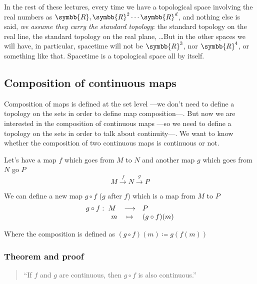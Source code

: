   In the rest of these lectures, every time we have a topological space
  involving the real numbers as $\symbb{R}, \symbb{R}^2 \cdots \symbb{R}^d$,
  and nothing else is said, \emph{we assume they carry the standard topology}:
  the standard topology on the real line, the standard topology on the real
  plane, \dots But in the other spaces we will have, in particular, spacetime
  will not be $\symbb{R}^3$, nor $\symbb{R}^4$, or something like that.
  Spacetime is a topological space all by itself.

  \subsection{Composition of continuous maps}
  Composition of maps is defined at the set level ---we don't need to define a
  topology on the sets in order to define map composition---.
  But now we are interested in the composition of continuous maps ---so we need
  to define a topology on the sets in order to talk about continuity---. We
  want to know whether the composition of two continuous maps is continuous or
  not.

  Let's have a map $f$ which goes from $M$ to $N$ and another map $g$ which goes
  from $N$ go $P$
  \[
    M
    \xrightarrow{\hspace{4pt}f\hspace{4pt}}
    N \xrightarrow{\hspace{5pt}g\hspace{5pt}}
    P
  \]

  We can define a new map $g\circ f$ ($g$ after $f$) which is a map from $M$ to
  $P$
  \[
    \begin{array}{rccl}
      g\circ f:& \hspace{-6pt}M & \longrightarrow & P \\
      &  m & \mapsto & (g\circ f)(m)
    \end{array}
  \]

  Where the composition is defined as $(g\circ f) (m) \coloneq g(f(m))$

  \subsubsection{Theorem and proof}
  \begin{quote}
    ``If $f$ and $g$ are continuous, then $g\circ f$ is also continuous.''
  \end{quote}

